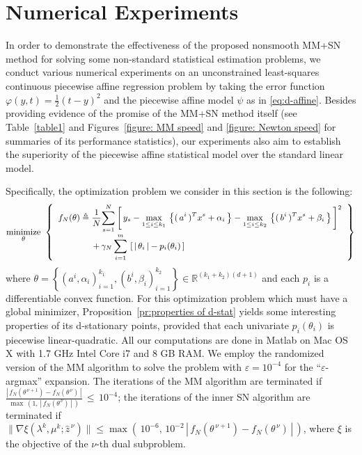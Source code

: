 \documentclass{siamart}
\newcommand{\wh}{\widehat}
\begin{document}
\section{Numerical Experiments} \label{sec:numerical}

In order to demonstrate the effectiveness of the proposed nonsmooth MM+SN method for solving some non-standard statistical estimation problems,
we conduct various numerical experiments on an unconstrained least-squares continuous piecewise affine regression problem by taking the error function
$\varphi(y,t) = \frac{1}{2}(t-y)^2$ and the piecewise affine model $\psi$ as in \eqref{eq:d-affine}.  Besides providing evidence of the promise
of the MM+SN method itself (see Table~\ref{table1} and Figures~\ref{figure: MM speed} and \ref{figure: Newton speed} for summaries
of its performance statistics), our experiments also aim
to establish the superiority of the piecewise affine statistical model over the standard linear model. %

Specifically, the optimization problem we consider
in this section is the following:
\[{\small
\displaystyle{
\operatornamewithlimits{\mbox{minimize}}_{\theta}
} \ \left\{ \begin{array}{l}
\displaystyle{
f_N(\theta)\triangleq  \frac{1}{N}
} \displaystyle{
\sum_{s=1}^N
}  \left[ \, y_s - \displaystyle{
\max_{1 \leq i \leq k_1}
} \, \left\{  ( \, a^i \, )^T x^s + \alpha_i \, \right\} - \displaystyle{
\max_{1 \leq i \leq k_2}
} \, \left\{  ( \, b^i \, )^T x^s + \beta_i \, \right\} \, \right]^2  \\ [0.15in]
\qquad\qquad  + \, \gamma_N \, \displaystyle{
\sum_{i=1}^m
} \, \left[  \, | \, \theta_i \, | - p_i(\theta_i) \, \right]
\end{array} \right\}}\]
where $\theta=\left\{ \left( a^i, \alpha_i \right)_{i=1}^{k_1}, \left( b^i, \beta_i \right)_{i=1}^{k_2} \right\}\in \mathbb{R}^{(k_1+k_2)(d+1)}$ and each $p_i$ is a differentiable convex function.  
For this optimization problem which must have a global minimizer,
Proposition~\ref{pr:properties of d-stat} yields some
interesting properties of its d-stationary points, provided that each univariate $p_i(\theta_i)$ is piecewise linear-quadratic.
All our computations are done in Matlab on Mac OS X with 1.7 GHz Intel Core i7 and 8 GB RAM.  We employ the randomized version of
the MM algorithm to solve the problem with $\varepsilon = 10^{-4}$ for the ``$\varepsilon$-argmax'' expansion.
The iterations of the MM algorithm are terminated if
$\displaystyle\frac{|\,f_N(\theta^{\,\nu+1}) - f_N(\theta^{\,\nu})\,|}{\max\,(1,\, |\,f_N(\theta^{\,\nu})\,|\,)}\,\leq \,10^{-4}$;
the iterations of the inner SN algorithm are terminated if
$\|\nabla \xi(\lambda^k, \mu^k;\wh{z}^{\,\nu})\|\leq \max\left(\,10^{-6},\,10^{-2}\,|\,f_N(\theta^{\,\nu+1}) - f_N(\theta^{\,\nu})\,|\,\right)$,
where $\xi$ is the objective of the $\nu$-th dual subproblem.
\end{document}
